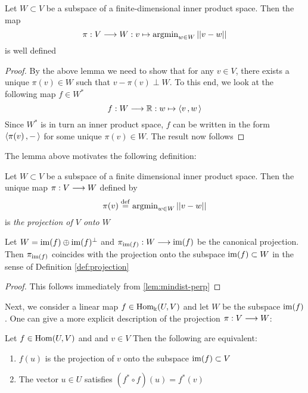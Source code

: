 \documentclass{dsp}
\begin{document}
\begin{lemma}\label{lem:projection}
	Let $W \subset V$ be a  subspace of a finite-dimensional inner product space. Then the map
	\[
	\pi: V\longrightarrow W: v \mapsto \operatorname{argmin}_{w \in W} \vert \vert v- w \vert \vert
	\]
	is well defined
\end{lemma}

\begin{proof}
	By the above lemma we need to show that for any $v \in V$, there exists a unique $\pi(v) \in W$ such that $v-\pi(v) \perp W$. To this end, we look at the following map $ f \in W^*$
	\[
	f: W \longrightarrow \mathbb{R}: w \mapsto \left\langle v\,,w\, \right\rangle
	\]
	Since $W^*$ is in turn an inner product space, $f$ can be written in the form $\left\langle \pi(v)\,,-\, \right\rangle$ for some unique $\pi(v) \in W$. The result now follows
\end{proof}

The lemma above motivates the following definition:

\begin{definition}\label{def:projection}
	Let $W\subset V$ be a subspace of a finite dimensional inner product space. Then the unique map $\pi: V\longrightarrow W$ defined by 
	\[
	\pi(v) \stackrel{\operatorname{def}}{=} \operatorname{argmin}_{w \in W}\vert \vert v-w \vert \vert
	\]
	is \emph{the projection of $V$ onto $W$}
\end{definition}
\begin{corollary}\label{lem:projcoincide}
	Let $W=\operatorname{im}(f)\oplus \operatorname{im}(f)^{\perp}$ and $\pi_{\operatorname{im}(f)}:W\longrightarrow \operatorname{im}(f)$ be the canonical projection. Then $\pi_{\operatorname{im}(f)}$ coincides with the projection onto the subspace $\operatorname{im}(f)\subset W$ in the sense of Definition \ref{def:projection}
\end{corollary}

\begin{proof}
This follows immediately from \ref{lem:mindist-perp}
\end{proof}
\noindent Next, we consider a linear map $f \in \operatorname{Hom}_\Bbbk(U,V)$ and let $W$ be the subspace $\operatorname{im}(f)$. One can give a more explicit description of the projection $\pi: V\longrightarrow W$:

\begin{lemma}\label{lem:normaleq}
	Let $f \in \operatorname{Hom}(U,V)$ and and $v \in V$ Then the following are equivalent:
	\begin{enumerate}
		\item	$f(u)$ is the projection of $v$ onto the subspace $\operatorname{im}(f)\subset V$
		\item The vector $u \in U$ satisfies $(f^* \circ f)(u) = f^*(v)$	
	\end{enumerate}
\end{lemma}
\end{document}
